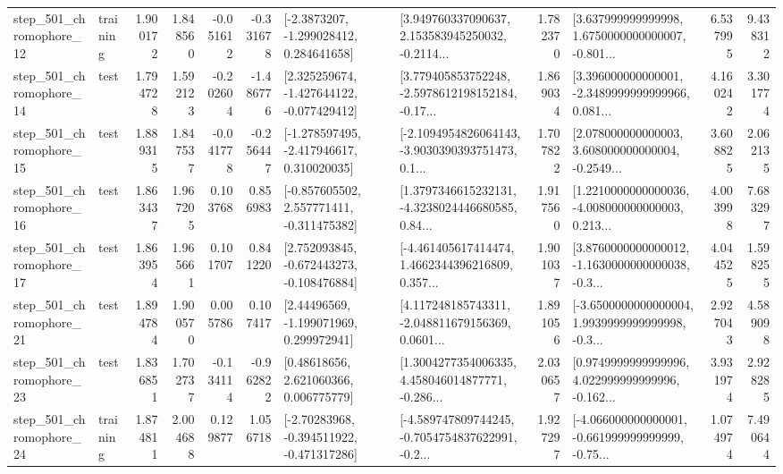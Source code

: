 \begin{tabular}{llrrrrllrlrr}
  step\_501\_chromophore\_12 &  training &      1.900172 &    1.848560 &     -0.051612 & -0.331678 &     [-2.3873207, -1.299028412, 0.284641658] &  [3.949760337090637, 2.153583945250032, -0.2114... &       1.782370 &  [3.637999999999998, 1.6750000000000007, -0.801... &            6.537995 &          9.438312 \\
  step\_501\_chromophore\_14 &      test &      1.794728 &    1.592123 &     -0.202604 & -1.486776 &   [2.325259674, -1.427644122, -0.077429412] &  [3.779405853752248, -2.5978612198152184, -0.17... &       1.869034 &  [3.396000000000001, -2.3489999999999966, 0.081... &            4.160242 &          3.301774 \\
  step\_501\_chromophore\_15 &      test &      1.889315 &    1.847537 &     -0.041778 & -0.256447 &   [-1.278597495, -2.417946617, 0.310020035] &  [-2.1094954826064143, -3.9030390393751473, 0.1... &       1.707822 &  [2.078000000000003, 3.608000000000004, -0.2549... &            3.608825 &          2.062135 \\
  step\_501\_chromophore\_16 &      test &      1.863437 &    1.967205 &      0.103768 &  0.856983 &   [-0.857605502, 2.557771411, -0.311475382] &  [1.3797346615232131, -4.3238024446680585, 0.84... &       1.917560 &  [1.2210000000000036, -4.008000000000003, 0.213... &            4.003998 &          7.683297 \\
  step\_501\_chromophore\_17 &      test &      1.863954 &    1.965661 &      0.101707 &  0.841220 &   [2.752093845, -0.672443273, -0.108476884] &  [-4.461405617414474, 1.4662344396216809, 0.357... &       1.901037 &  [3.8760000000000012, -1.1630000000000038, -0.3... &            4.044525 &          1.598255 \\
  step\_501\_chromophore\_21 &      test &      1.894784 &    1.900570 &      0.005786 &  0.107417 &     [2.44496569, -1.199071969, 0.299972941] &  [4.117248185743311, -2.048811679156369, 0.0601... &       1.891056 &  [-3.6500000000000004, 1.9939999999999998, -0.3... &            2.927043 &          4.589098 \\
  step\_501\_chromophore\_23 &      test &      1.836851 &    1.702737 &     -0.134114 & -0.962822 &      [0.48618656, 2.621060366, 0.006775779] &  [1.3004277354006335, 4.458046014877771, -0.286... &       2.030657 &  [0.9749999999999996, 4.022999999999996, -0.162... &            3.931974 &          2.928285 \\
  step\_501\_chromophore\_24 &  training &      1.874811 &    2.004688 &      0.129877 &  1.056718 &   [-2.70283968, -0.394511922, -0.471317286] &  [-4.589747809744245, -0.7054754837622991, -0.2... &       1.927297 &  [-4.066000000000001, -0.661999999999999, -0.75... &            1.074974 &          7.490644 \\

\end{tabular}
